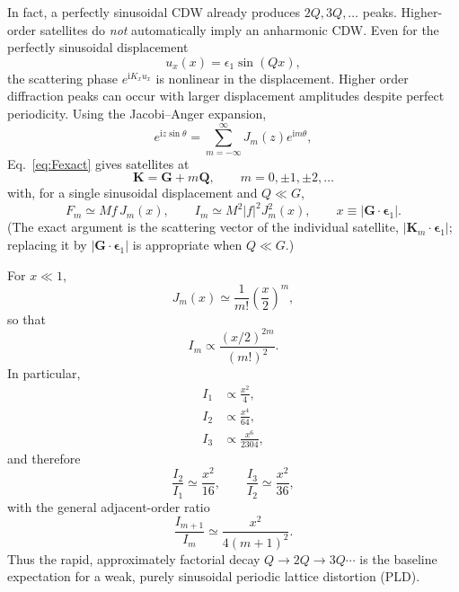 \documentclass[11pt]{article}
\newcommand{\e}{\epsilon}
\newcommand{\ii}{\mathrm{i}}
\newcommand{\bG}{\mathbf{G}}
\newcommand{\bQ}{\mathbf{Q}}
\newcommand{\bK}{\mathbf{K}}
\begin{document}
In fact, a perfectly sinusoidal CDW already produces $2Q,3Q,\ldots$ peaks. Higher-order satellites do \emph{not} automatically imply an anharmonic CDW. Even for the perfectly sinusoidal displacement
\begin{equation}
    u_x(x)=\e_1\sin(Qx),
\end{equation}
the scattering phase $e^{\ii K_xu_x}$ is nonlinear in the displacement. Higher order diffraction peaks can occur with larger displacement amplitudes despite perfect periodicity. Using the Jacobi--Anger expansion,
\begin{equation}
    e^{\ii z\sin\theta}
    =\sum_{m=-\infty}^{\infty}J_m(z)e^{\ii m\theta},
\end{equation}
Eq.~\eqref{eq:Fexact} gives satellites at
\begin{equation}
    \boxed{\bK=\bG+m\bQ,\qquad m=0,\pm1,\pm2,\ldots}
\end{equation}
with, for a single sinusoidal displacement and $Q\ll G$,
\begin{equation}
    F_m\simeq Mf\,J_m(x),
    \qquad
    I_m\simeq M^2|f|^2J_m^2(x),
    \qquad
    x\equiv|\bG\cdot\bm{\e}_1|.
    \label{eq:Bessel}
\end{equation}
(The exact argument is the scattering vector of the individual satellite, $|\bK_m\cdot\bm{\e}_1|$; replacing it by $|\bG\cdot\bm{\e}_1|$ is appropriate when $Q\ll G$.)

For $x\ll1$,
\begin{equation}
    J_m(x)\simeq\frac{1}{m!}\left(\frac{x}{2}\right)^m,
\end{equation}
so that
\begin{equation}
    \boxed{
    I_m\propto
    \frac{(x/2)^{2m}}{(m!)^2}.
    }
    \label{eq:factorial}
\end{equation}
In particular,
\begin{align}
 I_1&\propto \frac{x^2}{4},\\
 I_2&\propto \frac{x^4}{64},\\
 I_3&\propto \frac{x^6}{2304},
\end{align}
and therefore
\begin{equation}
    \boxed{\frac{I_2}{I_1}\simeq\frac{x^2}{16}},
    \qquad
    \boxed{\frac{I_3}{I_2}\simeq\frac{x^2}{36}},
\end{equation}
with the general adjacent-order ratio
\begin{equation}
    \boxed{
    \frac{I_{m+1}}{I_m}
    \simeq
    \frac{x^2}{4(m+1)^2}.
    }
    \label{eq:adjacentratio}
\end{equation}
Thus the rapid, approximately factorial decay $Q\to2Q\to3Q\cdots$ is the baseline expectation for a weak, purely sinusoidal periodic lattice distortion (PLD).
\end{document}
